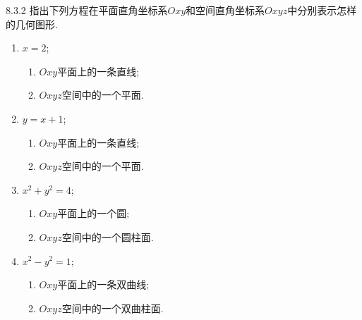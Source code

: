 \begin{exercise}{8.3.2}
    指出下列方程在平面直角坐标系$Oxy$和空间直角坐标系$Oxyz$中分别表示怎样的几何图形.
    \begin{enumerate}
        \item $x=2$;
        \begin{solution}
            \begin{multicols}{2}
            \begin{enumerate}
                \item $Oxy$平面上的一条直线;
                \item $Oxyz$空间中的一个平面.
            \end{enumerate}
            \end{multicols}
        \end{solution}

        \item $y=x+1$;
        \begin{solution}
            \begin{multicols}{2}
            \begin{enumerate}
                \item $Oxy$平面上的一条直线;
                \item $Oxyz$空间中的一个平面.
            \end{enumerate}
            \end{multicols}
        \end{solution} 

        \item $x^2+y^2=4$;
        \begin{solution}
            \begin{multicols}{2}
            \begin{enumerate}
                \item $Oxy$平面上的一个圆;
                \item $Oxyz$空间中的一个圆柱面.
            \end{enumerate}
            \end{multicols}
        \end{solution}

        \item $x^2-y^2=1$;
        \begin{solution}
            \begin{multicols}{2}
            \begin{enumerate}
                \item $Oxy$平面上的一条双曲线;
                \item $Oxyz$空间中的一个双曲柱面.
            \end{enumerate}
            \end{multicols}
        \end{solution}


\end{enumerate}
\end{exercise}
